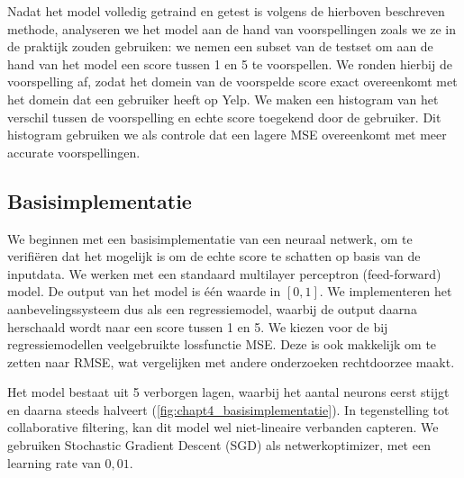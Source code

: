 Nadat het model volledig getraind en getest is volgens de hierboven beschreven methode, analyseren we het model aan de hand van voorspellingen zoals we ze in de praktijk zouden gebruiken: we nemen een subset van de testset om aan de hand van het model een score tussen 1 en 5 te voorspellen. We ronden hierbij de voorspelling af, zodat het domein van de voorspelde score exact overeenkomt met het domein dat een gebruiker heeft op Yelp. We maken een histogram van het verschil tussen de voorspelling en echte score toegekend door de gebruiker. Dit histogram gebruiken we als controle dat een lagere MSE overeenkomt met meer accurate voorspellingen.

\subsection{Basisimplementatie}
\label{sec:chapt4_basisimplementatie}
We beginnen met een basisimplementatie van een neuraal netwerk, om te verifiëren dat het mogelijk is om de echte score te schatten op basis van de inputdata. We werken met een standaard multilayer perceptron (feed-forward) model. De output van het model is één waarde in $[0, 1]$. We implementeren het aanbevelingssysteem dus als een regressiemodel, waarbij de output daarna herschaald wordt naar een score tussen 1 en 5. We kiezen voor de bij regressiemodellen veelgebruikte lossfunctie MSE. Deze is ook makkelijk om te zetten naar RMSE, wat vergelijken met andere onderzoeken rechtdoorzee maakt. \cite{narre, deepconn, wide_deep_learning_paper}

Het model bestaat uit 5 verborgen lagen, waarbij het aantal neurons eerst stijgt en daarna steeds halveert (\autoref{fig:chapt4_basisimplementatie}). In tegenstelling tot collaborative filtering, kan dit model wel niet-lineaire verbanden capteren. We gebruiken Stochastic Gradient Descent (SGD) als netwerkoptimizer, met een learning rate van $0,01$.




